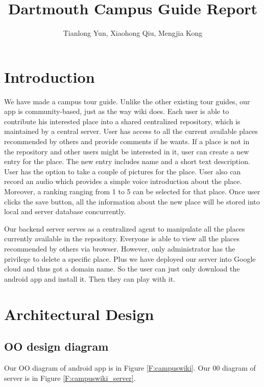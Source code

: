 \documentclass{article}
\title{Dartmouth Campus Guide Report}
\author{Tianlong Yun, Xiaohong Qiu, Mengjia Kong}
\begin{document}
\maketitle

\section{Introduction}
We have made a campus tour guide. Unlike the other existing tour guides, our app is community-based, just as the way wiki does. Each user is able to contribute his interested place into a shared centralized repository, which is maintained by a central server. User has access to all the current available places recommended by others and provide comments if he wants. If a place is not in the repository and other users might be interested in it, user can create a new entry for the place. The new entry includes name and a short text description. User has the option to take a couple of pictures for the place. User also can record an audio which provides a simple voice introduction about the place. Moreover, a ranking ranging from 1 to 5 can be selected for that place. Once user clicks the save button, all the information about the new place will be stored into local and server database concurrently.

Our backend server serves as a centralized agent to manipulate all the places currently available in the repository. Everyone is able to view all the places recommended by others via browser. However, only administrator has the privilege to delete a specific place. Plus we have deployed our server into Google cloud and thus got a domain name. So the user can just only download the android app and install it. Then they can play with it.


\section{Architectural Design}
\subsection{OO design diagram}
Our OO diagram of android app is in Figure \ref{F:campuswiki}. Our 00 diagram of server is in Figure \ref{F:campuswiki_server}.
\end{document}
